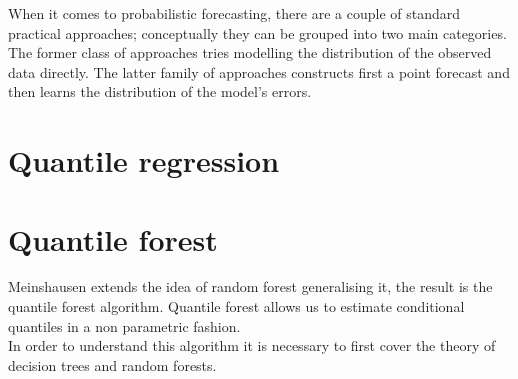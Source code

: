 When it comes to probabilistic forecasting, there are a couple of standard practical approaches; conceptually they can be grouped into two main categories. The former class of approaches tries modelling the distribution of the observed data directly. The latter family of approaches constructs first a point forecast and then learns the distribution of the model's errors.
\section{Quantile regression}


\section{Quantile forest}
Meinshausen \cite{meinshausen2006quantile} extends the idea of random forest \cite{breiman2001random} generalising it, the result is the quantile forest algorithm. Quantile forest allows us to estimate conditional quantiles in a non parametric fashion.
\\
In order to understand this algorithm it is necessary to first cover the theory of decision trees and random forests.
